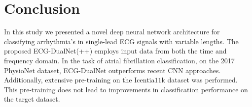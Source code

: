 \section{Conclusion} \label{sec:conclusion}

In this study we presented a novel deep neural network architecture for classifying arrhythmia's in single-lead ECG signals with variable lengths. The proposed ECG-DualNet(++) employs input data from both the time and frequency domain. In the task of atrial fibrillation classification, on the 2017 PhysioNet dataset, ECG-DualNet outperforms recent CNN approaches. Additionally, extensive pre-training on the Icentia$11$k dataset was performed. This pre-training does not lead to improvements in classification performance on the target dataset.
